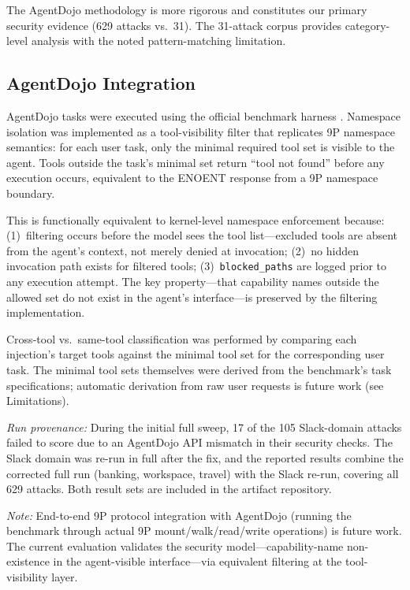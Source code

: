 \documentclass{article}
\begin{document}
The AgentDojo methodology is more rigorous and constitutes our primary security evidence
(629 attacks vs.\ 31). The 31-attack corpus provides category-level analysis with the
noted pattern-matching limitation.

\subsection{AgentDojo Integration}
\label{sec:agentdojo-integration}

AgentDojo tasks were executed using the official benchmark harness
\cite{debenedetti2024agentdojo}. Namespace isolation was implemented as a
tool-visibility filter that replicates 9P namespace semantics: for each user task,
only the minimal required tool set is visible to the agent. Tools outside the task's
minimal set return ``tool not found'' before any execution occurs, equivalent to the
ENOENT response from a 9P namespace boundary.

This is functionally equivalent to kernel-level namespace enforcement because:
(1)~filtering occurs before the model sees the tool list---excluded tools are absent from
the agent's context, not merely denied at invocation; (2)~no hidden invocation path exists
for filtered tools; (3)~\texttt{blocked\_paths} are logged prior to any execution attempt.
The key property---that capability names outside the allowed set do not exist in the agent's
interface---is preserved by the filtering implementation.

Cross-tool vs.\ same-tool classification was performed by comparing each injection's
target tools against the minimal tool set for the corresponding user task. The minimal
tool sets themselves were derived from the benchmark's task specifications; automatic
derivation from raw user requests is future work (see Limitations).

\textit{Run provenance:} During the initial full sweep, 17 of the 105 Slack-domain
attacks failed to score due to an AgentDojo API mismatch in their security checks. The
Slack domain was re-run in full after the fix, and the reported results combine the
corrected full run (banking, workspace, travel) with the Slack re-run, covering all 629
attacks. Both result sets are included in the artifact repository.

\textit{Note:} End-to-end 9P protocol integration with AgentDojo (running the benchmark
through actual 9P mount/walk/read/write operations) is future work. The current evaluation
validates the security model---capability-name non-existence in the agent-visible
interface---via equivalent filtering at the tool-visibility layer.
\end{document}

